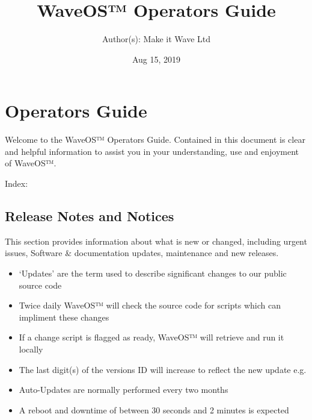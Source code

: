 \documentclass[letterpaper,10pt,openany,oneside,english]{sphinxmanual}
\title{WaveOS™ Operators Guide}
\date{Aug 15, 2019}
\author{Author(s): Make it Wave Ltd}
\begin{document}
\maketitle
\sphinxtableofcontents
{}\label{\detokenize{index::doc}}



\chapter{Operators Guide}
\label{\detokenize{index:operators-guide}}
Welcome to the WaveOS™ Operators Guide. Contained in this document is clear and helpful information to assist you in your understanding, use and enjoyment of WaveOS™.

Index:


\section{Release Notes and Notices}
\label{\detokenize{releasenotes:release-notes-and-notices}}\label{\detokenize{releasenotes::doc}}
This section provides information about what is new or changed, including urgent issues, Software \& documentation updates, maintenance and new releases.
\begin{itemize}
\item {} 
‘Updates’ are the term used to describe significant changes to our public source code

\item {} 
Twice daily WaveOS™ will check the source code for scripts which can impliment these changes

\item {} 
If a change script is flagged as ready, WaveOS™ will retrieve and run it locally

\item {} 
The last digit(s) of the versions ID will increase to reflect the new update e.g. 

\item {} 
Auto-Updates are normally performed every two months

\item {} 
A reboot and downtime of between 30 seconds and 2 minutes is expected

\end{itemize}
\end{document}
